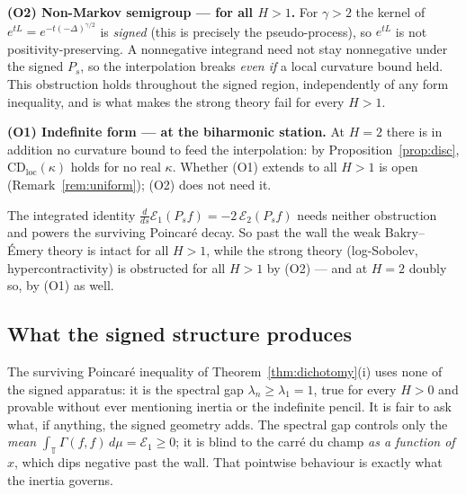 \documentclass[11pt,reqno]{amsart}
\theoremstyle{plain}
\theoremstyle{definition}
\newcommand{\T}{\mathbb{T}}
\newcommand{\Gam}{\Gamma}
\begin{document}
\smallskip\noindent\textbf{(O2) Non-Markov semigroup --- for all $H>1$.} For
$\gamma>2$ the kernel of $e^{tL}=e^{-t(-\Delta)^{\gamma/2}}$ is \emph{signed}
(this is precisely the pseudo-process), so $e^{tL}$ is not positivity-preserving.
A nonnegative integrand need not stay nonnegative under the signed $P_s$, so the
interpolation breaks \emph{even if} a local curvature bound held. This obstruction
holds throughout the signed region, independently of any form inequality, and is
what makes the strong theory fail for every $H>1$.

\smallskip\noindent\textbf{(O1) Indefinite form --- at the biharmonic station.}
At $H=2$ there is in addition no curvature bound to feed the interpolation:
by Proposition~\ref{prop:disc}, $\mathrm{CD}_{\mathrm{loc}}(\kappa)$ holds for no
real $\kappa$. Whether (O1) extends to all $H>1$ is open
(Remark~\ref{rem:uniform}); (O2) does not need it.

\smallskip
The integrated identity $\tfrac{d}{ds}\mathcal E_1(P_sf)=-2\,\mathcal E_2(P_sf)$
needs neither obstruction and powers the surviving Poincar\'e decay. So past the
wall the weak Bakry--\'Emery theory is intact for all $H>1$, while the strong
theory (log-Sobolev, hypercontractivity) is obstructed for all $H>1$ by (O2) ---
and at $H=2$ doubly so, by (O1) as well.

\subsection{What the signed structure produces}\label{sub:produces}
The surviving Poincar\'e inequality of Theorem~\ref{thm:dichotomy}(i) uses none of
the signed apparatus: it is the spectral gap $\lambda_n\ge\lambda_1=1$, true for
every $H>0$ and provable without ever mentioning inertia or the indefinite pencil.
It is fair to ask what, if anything, the signed geometry adds. The spectral gap
controls only the \emph{mean} $\int_\T\Gam(f,f)\,d\mu=\mathcal E_1\ge0$; it is
blind to the carr\'e du champ \emph{as a function of $x$}, which dips negative past
the wall. That pointwise behaviour is exactly what the inertia governs.
\end{document}
